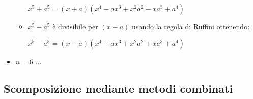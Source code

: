 \begin{itemize}[nosep]
\begin{itemize}[nosep]
\(x^5+a^5=(x+a)(x^4-ax^3+x^2a^2-xa^3+a^4)\)

\item \(x^5-a^5\) è divisibile per \((x-a)\) usando la regola di Ruffini
ottenendo: 

\(x^5-a^5=(x-a)(x^4+ax^3+x^2a^2+xa^3+a^4)\)

\end{itemize}

\item \(n=6\) ...

\end{itemize}

%  
% 
% 
% 
%  
% 
% 
% 
% 
% 

\subsection{Scomposizione mediante metodi combinati}
\label{subsec:divpol_metodicombinati}

